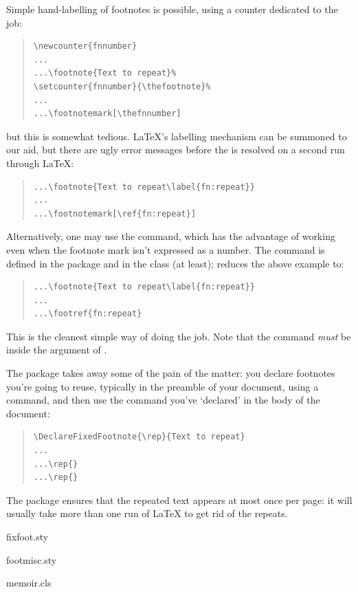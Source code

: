 Simple hand-labelling of footnotes is possible, using a counter dedicated
to the job:
\begin{quote}
\begin{verbatim}
\newcounter{fnnumber}
...
...\footnote{Text to repeat}%
\setcounter{fnnumber}{\thefootnote}%
...
...\footnotemark[\thefnnumber]
\end{verbatim}
\end{quote}
but this is somewhat tedious.  \LaTeX{}'s labelling mechanism can be
summoned to our aid, but there are ugly error messages before the
 is resolved on a second run through \LaTeX{}:
\begin{quote}
\begin{verbatim}
...\footnote{Text to repeat\label{fn:repeat}}
...
...\footnotemark[\ref{fn:repeat}]
\end{verbatim}
\end{quote}
Alternatively, one may use the  command, which has the
advantage of working even when the footnote mark isn't expressed as a
number.  The command is defined in the  package and
in the  class (at least);  reduces the above
example to:
\begin{quote}
\begin{verbatim}
...\footnote{Text to repeat\label{fn:repeat}}
...
...\footref{fn:repeat}
\end{verbatim}
\end{quote}
This is the cleanest simple way of doing the job.  Note that the
 command \emph{must} be inside the argument of
.

The  package takes away some of the pain of the
matter: you declare footnotes you're going to reuse, typically in the
preamble of your document, using a  command, and
then use the command you've `declared' in the body of the document:
\begin{quote}
\begin{verbatim}
\DeclareFixedFootnote{\rep}{Text to repeat}
...
...\rep{}
...\rep{}
\end{verbatim}
\end{quote}
The package ensures that the repeated text appears at most once per
page: it will usually take more than one run of \LaTeX{} to get rid of
the repeats.
\begin{ctanrefs}
\item[fixfoot.sty]
\item[footmisc.sty]
\item[memoir.cls]
\end{ctanrefs}


